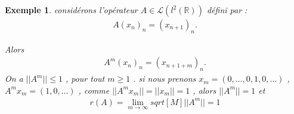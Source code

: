 \documentclass{report}
\newtheorem{Ex}{Exemple}[subsection]
\begin{document}
{\begin{Ex} considérons l'opérateur $A \in \mathscr{L}(l^2(\mathbb{R}))$ défini par : 
					\begin{align*}
								 A(x_n)_n = (x_{n+1})_n .
					\end{align*}




	Alors 
					\begin{align*}
								 A^m (x_n)_n = (x_{n+1+m})_n .
					\end{align*}
	On a $||A^m|| \le 1$ , pour tout $m \ge 1$ . si nous prenons $x_m = (0, \ldots, 0, 1, 0, \ldots)$ , $A^m x_m = (1, 0, \ldots)$ , comme $||A^m x_m|| = ||x_m|| = 1$ , alors $||A^m|| = 1$ et 
					\begin{align*}
								 r(A) = \lim_{m\to \infty} sqrt[M]{||A^m||} = 1 
					\end{align*}
\end{Ex}

}
\end{document}
